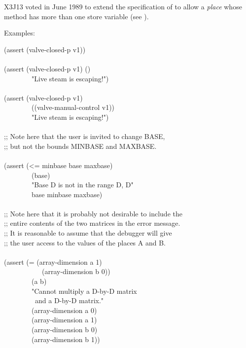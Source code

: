 \begin{defmac}
\begin{newer}
X3J13 voted in June 1989 
to extend the specification of  to allow a \emph{place}
whose  method has more than one store variable (see ).
\end{newer}

Examples:
\begin{lisp}
(assert (valve-closed-p v1)) \\
 \\
(assert (valve-closed-p v1) () \\
~~~~~~~~"Live steam is escaping!") \\
 \\
(assert (valve-closed-p v1) \\
~~~~~~~~((valve-manual-control v1)) \\
~~~~~~~~"Live steam is escaping!") \\
 \\
;; Note here that the user is invited to change BASE,  \\
;; but not the bounds MINBASE and MAXBASE. \\[3pt]
\\
(assert (<= minbase base maxbase) \\
~~~~~~~~(base) \\
~~~~~~~~"Base {\Xtilde}D is not in the range {{\Xtilde}D, {\Xtilde}D}" \\
~~~~~~~~base minbase maxbase) \\
 \\
;; Note here that it is probably not desirable to include the \\
;; entire contents of the two matrices in the error message. \\
;; It is reasonable to assume that the debugger will give \\
;; the user access to the values of the places A and B. \\
\\
(assert (= (array-dimension a 1)  \\
~~~~~~~~~~~(array-dimension b 0)) \\
~~~~~~~~(a b) \\
~~~~~~~~"Cannot multiply a {\Xtilde}D-by-{\Xtilde}D matrix {\Xtilde} \\
~~~~~~~~~and a {\Xtilde}D-by-{\Xtilde}D matrix." \\
~~~~~~~~(array-dimension a 0) \\
~~~~~~~~(array-dimension a 1) \\
~~~~~~~~(array-dimension b 0) \\
~~~~~~~~(array-dimension b 1))
\end{lisp}
\end{defmac}

